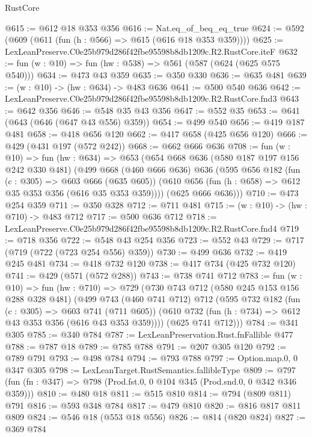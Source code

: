 \begin{lexlean}{RustCore}
\begin{coremodule}
@615 := @612 @18 @353 @356
@616 := Nat.eq_of_beq_eq_true
@624 := @592 (@609 (@611 (fun (h : @566) => @615 (@616 @18 @353 @359))))
@625 := LexLeanPreserve.C0e25b979d286f42fbe95598b8db1209c.R2.RustCore.iteF
@632 := fun (w : @10) => fun (hw : @538) => @561 (@587 (@624 (@625 @575 @540)))
@634 := @473 @43 @359
@635 := @350 @330
@636 := @635 @481
@639 := (w : @10) -> (hw : @634) -> @483 @636
@641 := @500 @540 @636
@642 := LexLeanPreserve.C0e25b979d286f42fbe95598b8db1209c.R2.RustCore.fnd3
@643 := @642 @356
@646 := @548 @35 @43 @356
@647 := @552 @35
@653 := @641 (@643 (@646 (@647 @43 @556) @359))
@654 := @499 @540
@656 := @419 @187 @481
@658 := @418 @656 @120
@662 := @417 @658 (@425 @656 @120)
@666 := @429 (@431 @197 (@572 @242))
@668 := @662 @666 @636
@708 := fun (w : @10) =>
  fun (hw : @634) =>
  @653
    (@654
      @668
      @636
      (@580 @187 @197 @156 @242 @330 @481)
      (@499
        @668
        (@460 @666 @636)
        @636
        (@595
          @656
          @182
          (fun (c : @305) => @603 @666 (@635 @605))
          (@610 @656 (fun (h : @658) => @612 @35 @353 @356 (@616 @35 @353 @359))))
        (@625 @666 @636)))
@710 := @473 @254 @359
@711 := @350 @328
@712 := @711 @481
@715 := (w : @10) -> (hw : @710) -> @483 @712
@717 := @500 @636 @712
@718 := LexLeanPreserve.C0e25b979d286f42fbe95598b8db1209c.R2.RustCore.fnd4
@719 := @718 @356
@722 := @548 @43 @254 @356
@723 := @552 @43
@729 := @717 (@719 (@722 (@723 @254 @556) @359))
@730 := @499 @636
@732 := @419 @245 @481
@734 := @418 @732 @120
@738 := @417 @734 (@425 @732 @120)
@741 := @429 (@571 (@572 @288))
@743 := @738 @741 @712
@783 := fun (w : @10) =>
  fun (hw : @710) =>
  @729
    (@730
      @743
      @712
      (@580 @245 @153 @156 @288 @328 @481)
      (@499
        @743
        (@460 @741 @712)
        @712
        (@595
          @732
          @182
          (fun (c : @305) => @603 @741 (@711 @605))
          (@610 @732 (fun (h : @734) => @612 @43 @353 @356 (@616 @43 @353 @359))))
        (@625 @741 @712)))
@784 := @341 @305
@785 := @340 @784
@787 := LexLeanPreservation.Rust.fnFallible @477
@788 := @787 @18
@789 := @785 @788
@791 := @207 @305 @120
@792 := @789 @791
@793 := @498 @784
@794 := @793 @788
@797 := Option.map.{0, 0} @347 @305
@798 := LexLeanTarget.RustSemantics.fallibleType
@809 := @797 (fun (fn : @347) => @798 (Prod.fst.{0, 0} @104 @345 (Prod.snd.{0, 0} @342 @346 @359)))
@810 := @480 @18
@811 := @515 @810
@814 := @794 (@809 @811) @791
@816 := @593 @348 @784
@817 := @479 @810
@820 := @816 @817 @811 @809
@824 := @546 @18 (@553 @18 @556)
@826 := @814 (@820 @824)
@827 := @369 @784

\end{coremodule}
\end{lexlean}

